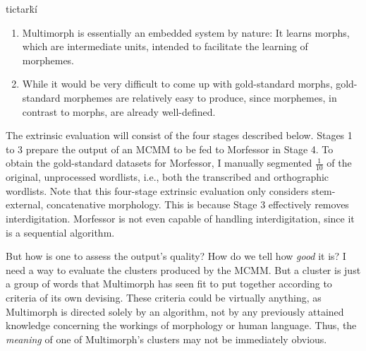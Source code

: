 tic\.{t}ar\.{k}\'{i} %

\begin{enumerate}
\item Multimorph is essentially an embedded system by nature: It learns morphs, which are intermediate units, intended to facilitate the learning of morphemes. %
\item While it would be very difficult to come up with gold-standard morphs, gold-standard morphemes are relatively easy to produce, since morphemes, in contrast to morphs, are already well-defined. 
\end{enumerate}

The extrinsic evaluation will consist of the four stages described below. 
Stages 1 to 3 prepare the output of an MCMM to be fed to Morfessor in Stage 4. 
To obtain the gold-standard datasets for Morfessor, I manually segmented 
$\frac{1}{10}$ of the original, unprocessed wordlists, i.e., both the transcribed 
and orthographic wordlists. Note that this four-stage extrinsic evaluation only considers 
stem-external, concatenative morphology. This is because Stage 3 effectively removes 
interdigitation. Morfessor is not even capable of handling interdigitation, since it is 
a sequential algorithm.

But how is one to assess the output's quality? How do we tell how \emph{good} it is? I need a way to evaluate the clusters produced by the MCMM.
But a cluster is just a group of words that Multimorph has seen fit to put together according to criteria of its own devising.
These criteria could be virtually anything, as Multimorph is directed solely by an algorithm, not by any previously attained knowledge concerning
the workings of morphology or human language. 
Thus, the \emph{meaning} of one of Multimorph's clusters may not be immediately obvious.
 
 
